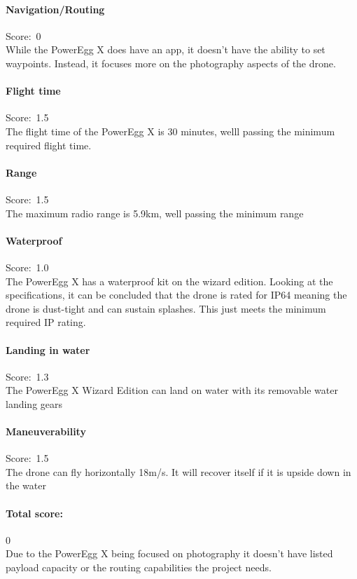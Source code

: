 \paragraph{Navigation/Routing}\mbox{Score: 0} \\
While the PowerEgg X does have an app, it doesn't have the ability to set waypoints. Instead, it focuses more on the photography aspects of the drone.

\paragraph{Flight time}\mbox{Score: 1.5} \\
The flight time of the PowerEgg X is 30 minutes, welll passing the minimum required flight time.

\paragraph{Range}\mbox{Score: 1.5} \\
The maximum radio range is 5.9km, well passing the minimum range

\paragraph{Waterproof}\mbox{Score: 1.0} \\
The PowerEgg X has a waterproof kit on the wizard edition. Looking at the specifications, it can be concluded that the drone is rated for IP64 meaning the drone is dust-tight and can sustain splashes. This just meets the minimum required IP rating.

\paragraph{Landing in water}\mbox{Score: 1.3} \\
The PowerEgg X Wizard Edition can land on water with its removable water landing gears

\paragraph{Maneuverability}\mbox{Score: 1.5} \\
The drone can fly horizontally 18m/s. It will recover itself if it is upside down in the water

\paragraph{Total score:}\mbox{0} \\
Due to the PowerEgg X being focused on photography it doesn't have listed payload capacity or the routing capabilities the project needs.

